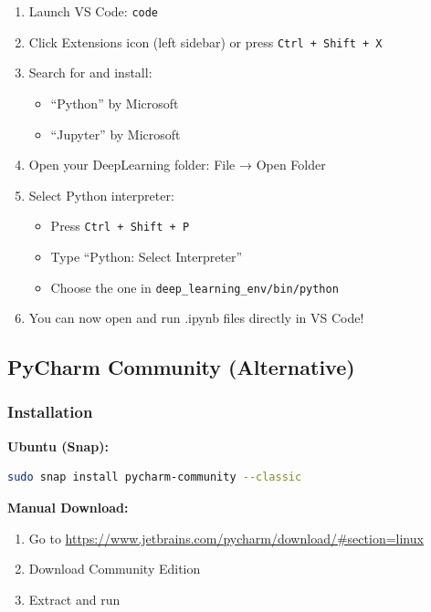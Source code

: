 \documentclass[11pt,a4paper]{article}
\begin{document}
\begin{enumerate}
    \item Launch VS Code: \texttt{code}
    
    \item Click Extensions icon (left sidebar) or press \texttt{Ctrl + Shift + X}
    
    \item Search for and install:
    \begin{itemize}
        \item ``Python'' by Microsoft
        \item ``Jupyter'' by Microsoft
    \end{itemize}
    
    \item Open your DeepLearning folder: File → Open Folder
    
    \item Select Python interpreter:
    \begin{itemize}
        \item Press \texttt{Ctrl + Shift + P}
        \item Type ``Python: Select Interpreter''
        \item Choose the one in \texttt{deep\_learning\_env/bin/python}
    \end{itemize}
    
    \item You can now open and run .ipynb files directly in VS Code!
\end{enumerate}

\subsection{PyCharm Community (Alternative)}

\subsubsection{Installation}

\textbf{Ubuntu (Snap):}
\begin{lstlisting}[language=bash]
sudo snap install pycharm-community --classic
\end{lstlisting}

\textbf{Manual Download:}
\begin{enumerate}
    \item Go to \url{https://www.jetbrains.com/pycharm/download/#section=linux}
    \item Download Community Edition
    \item Extract and run
\end{enumerate}
\end{document}
